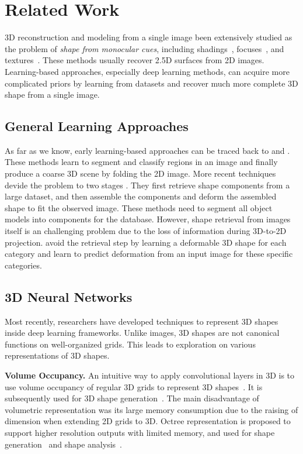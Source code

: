 \section{Related Work}
3D reconstruction and modeling from a single image  been extensively studied as the problem of \emph{shape from monocular cues}, including shadings~\cite{shapefromshadingsurvey}, focuses~\cite{shapefromdf1,shapefromdf2}, and textures~\cite{Aloimonos1988}. 
These methods usually recover 2.5D surfaces from 2D images. 
Learning-based approaches, especially deep learning methods, can acquire more complicated priors by learning from datasets and recover much more complete 3D shape from a single image.
 
\subsection{General Learning Approaches}
As far as we know, early learning-based approaches can be traced back to \cite{Hoiem2007} and \cite{learn3D2007}. These methods learn to segment and classify regions in an image and finally produce a coarse 3D scene by folding the 2D image.
%
More recent techniques devide the problem to two stages \cite{Su:2014,jointimgshape}. They first retrieve shape components from a large dataset, and then assemble the components and deform the assembled shape to fit the observed image. These methods need to segment all object models into components for the database.
%
However, shape retrieval from images itself is an challenging problem due to the loss of information during 3D-to-2D projection. 
\cite{imgrecon15} avoid the retrieval step by learning a deformable 3D shape for each category and learn to predict deformation from an input image for these specific categories.
%
\subsection{3D Neural Networks}
Most recently, researchers have developed techniques to represent 3D shapes inside deep learning frameworks. Unlike images, 3D shapes are not canonical functions on well-organized grids.
This leads to exploration on various representations of 3D shapes.

\noindent\textbf{Volume Occupancy.}
An intuitive way to apply convolutional layers in 3D is to use volume occupancy of regular 3D grids to represent 3D shapes~\cite{3dshapenet}. It is subsequently used for 3D shape generation~\cite{3DR2N2,learnobj}.
%
The main disadvantage of volumetric representation was its large memory consumption due to the raising of dimension when extending 2D grids to 3D. 
Octree representation is proposed to support higher resolution outputs with limited memory, and used for shape generation~\cite{octreegen} and shape analysis~\cite{ocnn}.


